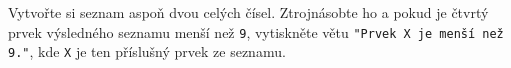 \question[30]
Vytvořte si seznam aspoň dvou celých čísel. Ztrojnásobte ho a pokud je čtvrtý
prvek výsledného seznamu menší než \texttt{9}, vytiskněte větu \texttt{"Prvek X
je menší než 9."}, kde \texttt{X} je ten příslušný prvek ze seznamu.